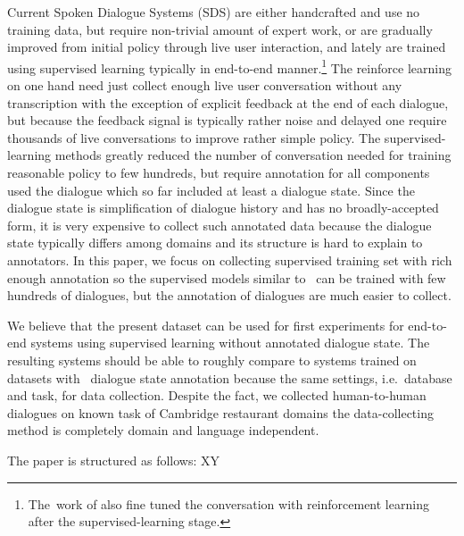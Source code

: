 \documentclass[runningheads,a4paper]{llncs}
\begin{document}
Current Spoken Dialogue Systems (SDS) are either handcrafted and use no training data\cite{duvsek2014alex,raux2005let}, but require non-trivial amount of expert work, or are gradually improved from initial policy through live user interaction\cite{young2010hidden,gasic2011line}, and lately are trained using supervised learning typically in end-to-end manner\cite{wen2016network,williams2016end}.\footnote{The~work of \cite{williams2016end} also fine tuned the conversation with reinforcement learning after the supervised-learning stage.}
The reinforce learning on one hand need just collect enough live user conversation without any transcription with the exception of explicit feedback at the end of each dialogue, but because the feedback signal is typically rather noise and delayed one require thousands of live conversations to improve rather simple policy.\cite{gasic2011line}
The supervised-learning methods greatly reduced the number of conversation needed for training reasonable policy to few hundreds\cite{wen2016network}, but require annotation for all components used the dialogue which so far included at least a dialogue state\cite{wen2016network,young2010hidden}.
Since the dialogue state is simplification of dialogue history and has no broadly-accepted form, it is very expensive to collect such annotated data because the dialogue state typically differs among domains and its structure is hard to explain to annotators.
In this paper, we focus on collecting supervised training set with rich enough annotation so the supervised models similar to~\cite{wen2016network} can be trained with few hundreds of dialogues, but the annotation of dialogues are much easier to collect.

We believe that the present dataset can be used for first experiments for end-to-end systems using supervised learning without annotated dialogue state.
The resulting systems should be able to roughly compare to systems trained on datasets with~\cite{williams2013dstc1,henderson2014dstc2,henderson2014dstc3} dialogue state annotation because the same settings, i.e.\ database and task, for data collection.
Despite the fact, we collected human-to-human dialogues on known task of Cambridge restaurant domains the data-collecting method is completely domain and language independent.

The paper is structured as follows:
XY

\end{document}
